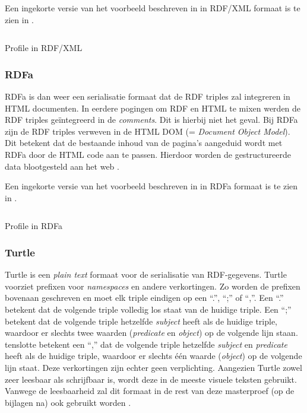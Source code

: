 Een ingekorte versie van het voorbeeld beschreven in  in RDF/XML formaat is te zien in .

\begin{listing}[ht]
    \inputminted{xml}{data/profile_short.rdf}
    \caption{Profile in RDF/XML}
    \label{listing:profile_xml}
\end{listing}


\subsubsection{RDFa}
RDFa is dan weer een serialisatie formaat dat de RDF triples zal integreren in HTML documenten. In eerdere pogingen om RDF en HTML te mixen werden de RDF triples geïntegreerd in de \textit{comments}. Dit is hierbij niet het geval. Bij RDFa zijn de RDF triples verweven in de HTML DOM (= \textit{Document Object Model}). Dit betekent dat de bestaande inhoud van de pagina's aangeduid wordt met RDFa door de HTML code aan te passen. Hierdoor worden de gestructureerde data blootgesteld aan het web \cite{adida2012rdfa}.

Een ingekorte versie van het voorbeeld beschreven in  in RDFa formaat is te zien in .

\begin{listing}[ht]
    \inputminted{html}{data/profile_short.html}
    \caption{Profile in RDFa}
    \label{listing:profile_rdfa}
\end{listing}


\subsubsection{Turtle}
Turtle is een \textit{plain text} formaat voor de serialisatie van RDF-gegevens. Turtle voorziet prefixen voor \textit{namespaces} en andere verkortingen. Zo worden de prefixen bovenaan geschreven en moet elk triple eindigen op een ``.'', ``;'' of ``,''. Een ``.'' betekent dat de volgende triple volledig los staat van de huidige triple. Een ``;'' betekent dat de volgende triple hetzelfde \textit{subject} heeft als de huidige triple, waardoor er slechts twee waarden (\textit{predicate} en \textit{object}) op de volgende lijn staan. tenslotte betekent een ``,'' dat de volgende triple hetzelfde \textit{subject} en \textit{predicate} heeft als de huidige triple, waardoor er slechts één waarde (\textit{object}) op de volgende lijn staat. Deze verkortingen zijn echter geen verplichting. Aangezien Turtle zowel zeer leesbaar als schrijfbaar is, wordt deze in de meeste visuele teksten gebruikt. Vanwege de leesbaarheid zal dit formaat in de rest van deze masterproef (op de bijlagen na) ook gebruikt worden  \cite{beckett2014rdfturtle}.

